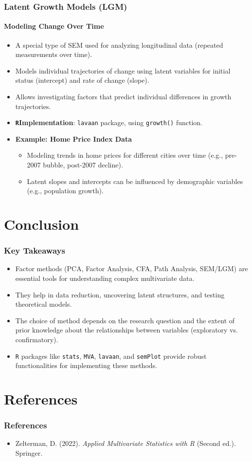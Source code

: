 \documentclass{beamer}
\newcommand{\R}{\texttt{R}}
\newcommand{\code}[1]{\texttt{#1}}
\begin{document}
\begin{frame}
    \frametitle{Latent Growth Models (LGM)}
    \framesubtitle{Modeling Change Over Time}
    \begin{itemize}
        \item A special type of SEM used for analyzing \alert{longitudinal data} (repeated measurements over time).
        \item Models individual trajectories of change using latent variables for initial status (intercept) and rate of change (slope).
        \item Allows investigating factors that predict individual differences in growth trajectories.
        \item \textbf{\R Implementation}: \code{lavaan} package, using \code{growth()} function.
        \item \textbf{Example: Home Price Index Data}
            \begin{itemize}
                \item Modeling trends in home prices for different cities over time (e.g., pre-2007 bubble, post-2007 decline).
                \item Latent slopes and intercepts can be influenced by demographic variables (e.g., population growth).
            \end{itemize}
    \end{itemize}
\end{frame}

\section{Conclusion}

\begin{frame}
    \frametitle{Key Takeaways}
    \begin{itemize}
        \item Factor methods (PCA, Factor Analysis, CFA, Path Analysis, SEM/LGM) are essential tools for understanding complex multivariate data.
        \item They help in \alert{data reduction}, uncovering \alert{latent structures}, and \alert{testing theoretical models}.
        \item The choice of method depends on the research question and the extent of prior knowledge about the relationships between variables (exploratory vs. confirmatory).
        \item \code{R} packages like \code{stats}, \code{MVA}, \code{lavaan}, and \code{semPlot} provide robust functionalities for implementing these methods.
    \end{itemize}
\end{frame}

\section*{References}
\begin{frame}
    \frametitle{References}
    \begin{itemize}
        \item Zelterman, D. (2022). \textit{Applied Multivariate Statistics with R} (Second ed.). Springer.
    \end{itemize}
\end{frame}
\end{document}
